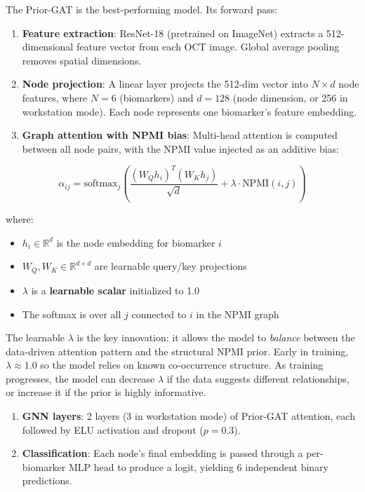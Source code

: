 \documentclass[12pt,a4paper]{article}
\begin{document}
The Prior-GAT is the best-performing model. Its forward pass:

\begin{enumerate}[nosep]
  \item \textbf{Feature extraction}: ResNet-18 (pretrained on ImageNet) extracts a 512-dimensional feature vector from each OCT image. Global average pooling removes spatial dimensions.
  \item \textbf{Node projection}: A linear layer projects the 512-dim vector into $N \times d$ node features, where $N=6$ (biomarkers) and $d=128$ (node dimension, or 256 in workstation mode). Each node represents one biomarker's feature embedding.
  \item \textbf{Graph attention with NPMI bias}: Multi-head attention is computed between all node pairs, with the NPMI value injected as an additive bias:
\end{enumerate}

\begin{equation}
\alpha_{ij} = \text{softmax}_j\left(\frac{(W_Q h_i)^T (W_K h_j)}{\sqrt{d}} + \lambda \cdot \text{NPMI}(i,j)\right)
\end{equation}

where:
\begin{itemize}[nosep]
  \item $h_i \in \mathbb{R}^d$ is the node embedding for biomarker $i$
  \item $W_Q, W_K \in \mathbb{R}^{d \times d}$ are learnable query/key projections
  \item $\lambda$ is a \textbf{learnable scalar} initialized to 1.0
  \item The softmax is over all $j$ connected to $i$ in the NPMI graph
\end{itemize}

The learnable $\lambda$ is the key innovation: it allows the model to \emph{balance} between the data-driven attention pattern and the structural NPMI prior. Early in training, $\lambda \approx 1.0$ so the model relies on known co-occurrence structure. As training progresses, the model can decrease $\lambda$ if the data suggests different relationships, or increase it if the prior is highly informative.

\begin{enumerate}[nosep,start=4]
  \item \textbf{GNN layers}: 2 layers (3 in workstation mode) of Prior-GAT attention, each followed by ELU activation and dropout ($p=0.3$).
  \item \textbf{Classification}: Each node's final embedding is passed through a per-biomarker MLP head to produce a logit, yielding 6 independent binary predictions.
\end{enumerate}
\end{document}
